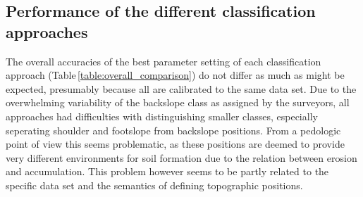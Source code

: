 \documentclass[preprint,12pt,authoryear]{elsarticle}
\begin{document}
\subsection{Performance of the different classification approaches}  
The overall accuracies of the best parameter setting of each classification approach (Table\,\ref{table:overall_comparison}) do not differ as much as might be expected, presumably because all are calibrated to the same data set. Due to the overwhelming variability of the backslope class as assigned by the surveyors, all approaches had difficulties with distinguishing smaller classes, especially seperating shoulder and footslope from backslope positions. From a pedologic point of view this seems problematic, as these positions are deemed to provide very different environments for soil formation due to the relation between erosion and accumulation. This problem however seems to be partly related to the specific data set and the semantics of defining topographic positions. 
\end{document}
